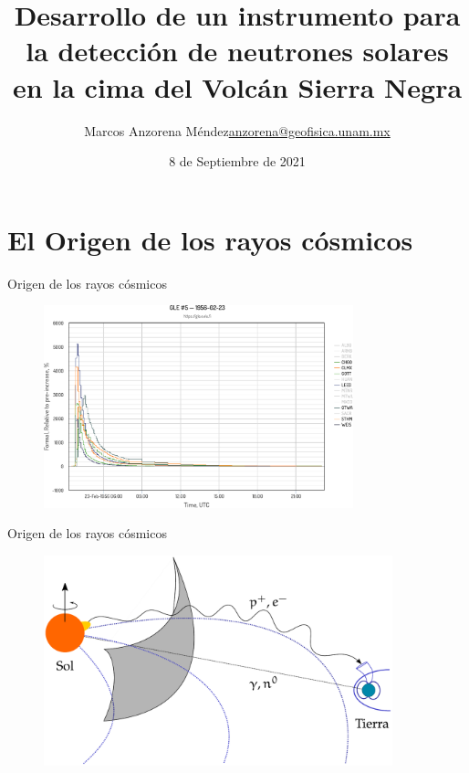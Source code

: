\documentclass[spanish,aspectratio=169]{beamer}
\title [Desarrollo de un instrumento para la detección de neutrones solares]{Desarrollo de un instrumento para la detección de neutrones solares en la cima del Volcán Sierra Negra}
\author{\texorpdfstring{Marcos Anzorena Méndez\newline\url{anzorena@geofisica.unam.mx}}{Marcos Anzorena Méndez}}
\date{8 de Septiembre de 2021}
\institute{Instituto de Geofísica\\
Universidad Nacional Autónoma de México}
\begin{document}
\maketitle


\section
[El Origen de los rayos cósmicos]{El Origen de los rayos cósmicos}
\frame{\sectionpage}


\begin{frame}{Origen de los rayos cósmicos}

\begin{figure}
	\centering
	\includegraphics[width=0.8\textwidth]{GLE.oulu.fi.pdf}
\end{figure}

\end{frame}

\begin{frame}{Origen de los rayos cósmicos}

\begin{figure}
	\centering
	\includegraphics[width=0.9\textwidth]{solar-neutron.pdf}
\end{figure}

\end{frame}
\end{document}
